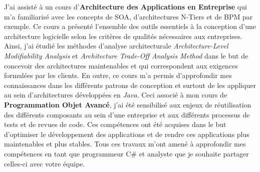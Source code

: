 J'ai assisté à un cours d'\textbf{Architecture des Applications en Entreprise} qui m'a familiarisé avec les concepts de SOA, d'architectures N-Tiers et de BPM par exemple. Ce cours a présenté l'ensemble des outils essentiels à la conception d'une architecture logicielle selon les critères de qualités nécessaires aux entreprises. Ainsi, j'ai étudié les méthodes d'analyse architecturale \textit{Architecture-Level Modifiability Analysis} et \textit{Architecture Trade-Off Analysis Method} dans le but de concevoir des architectures maintenables et qui correspondent aux exigences formulées par les clients. En outre, ce cours m'a permis d'approfondir mes connaissances dans les différents patrons de conception et surtout de les appliquer au sein d'architectures développées en \textit{Java}. Ceci associé à mon cours de \textbf{Programmation Objet Avancé}, j'ai été sensibilisé aux enjeux de réutilisation des différents composants au sein d'une entreprise et aux différents processus de tests et de revues de code. Ces compétences ont été acquises dans le but d'optimiser le développement des applications et de rendre ces applications plus maintenables et plus stables. Tous ces travaux m'ont amené à approfondir mes compétences en tant que programmeur C\# et analyste que je souhaite partager celles-ci avec votre équipe.
\conclusion{}
\makeletterclosing
